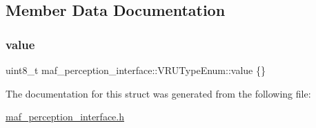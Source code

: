 \subsection{Member Data Documentation}
\mbox{\label{structmaf__perception__interface_1_1VRUTypeEnum_a996353676859d128e696cc1c3bb65d11}} 
\subsubsection{\texorpdfstring{value}{value}}
{\footnotesize\ttfamily uint8\+\_\+t maf\+\_\+perception\+\_\+interface\+::\+V\+R\+U\+Type\+Enum\+::value \{\}}



The documentation for this struct was generated from the following file\+:\begin{DoxyCompactItemize}
\item 
\hyperlink{maf__perception__interface_8h}{maf\+\_\+perception\+\_\+interface.\+h}\end{DoxyCompactItemize}
